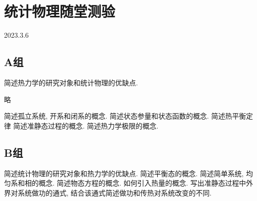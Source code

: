\section{统计物理随堂测验}
2023.3.6
\subsection{A组}
\begin{questions}
  \question 简述热力学的研究对象和统计物理的优缺点.
  \begin{solution}
    略
  \end{solution}
  \question 简述孤立系统, 开系和闭系的概念.
  \question 简述状态参量和状态函数的概念.
  \question 简述热平衡定律
  \question 简述准静态过程的概念.
  \question 简述热力学极限的概念.
\end{questions}
\subsection{B组}
\begin{questions}
  \question 简述统计物理的研究对象和热力学的优缺点.
  \question 简述平衡态的概念.
  \question 简述简单系统, 均匀系和相的概念.
  \question 简述物态方程的概念.
  \question 如何引入热量的概念.
  \question 写出准静态过程中外界对系统做功的通式, 结合该通式简述做功和传热对系统改变的不同.
\end{questions}